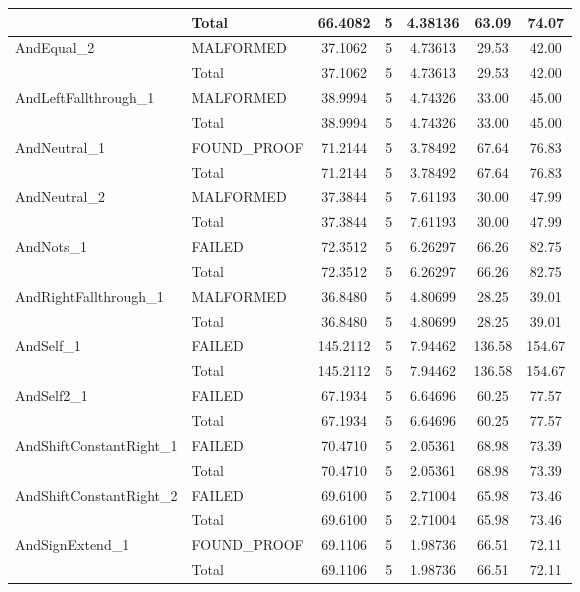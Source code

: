 \begin{appendices}
\begin{longtable}{L{0.25\textwidth} L{0.2\textwidth}  c  c  c  c  c }
    & Total & 66.4082 & 5 & 4.38136 & 63.09 & 74.07 \\ \midrule 
    AndEqual\_2 & MALFORMED & 37.1062 & 5 & 4.73613 & 29.53 & 42.00 \\ \midrule 
    & Total & 37.1062 & 5 & 4.73613 & 29.53 & 42.00 \\ \midrule 
    AndLeftFallthrough\_1 & MALFORMED & 38.9994 & 5 & 4.74326 & 33.00 & 45.00 \\ \midrule 
    & Total & 38.9994 & 5 & 4.74326 & 33.00 & 45.00 \\ \midrule 
    AndNeutral\_1 & FOUND\_PROOF & 71.2144 & 5 & 3.78492 & 67.64 & 76.83 \\ \midrule 
    & Total & 71.2144 & 5 & 3.78492 & 67.64 & 76.83 \\ \midrule 
    AndNeutral\_2 & MALFORMED & 37.3844 & 5 & 7.61193 & 30.00 & 47.99 \\ \midrule 
    & Total & 37.3844 & 5 & 7.61193 & 30.00 & 47.99 \\ \midrule 
    AndNots\_1 & FAILED & 72.3512 & 5 & 6.26297 & 66.26 & 82.75 \\ \midrule 
    & Total & 72.3512 & 5 & 6.26297 & 66.26 & 82.75 \\ \midrule 
    AndRightFallthrough\_1 & MALFORMED & 36.8480 & 5 & 4.80699 & 28.25 & 39.01 \\ \midrule 
    & Total & 36.8480 & 5 & 4.80699 & 28.25 & 39.01 \\ \midrule 
    AndSelf\_1 & FAILED & 145.2112 & 5 & 7.94462 & 136.58 & 154.67 \\ \midrule 
    & Total & 145.2112 & 5 & 7.94462 & 136.58 & 154.67 \\ \midrule 
    AndSelf2\_1 & FAILED & 67.1934 & 5 & 6.64696 & 60.25 & 77.57 \\ \midrule 
    & Total & 67.1934 & 5 & 6.64696 & 60.25 & 77.57 \\ \midrule 
    AndShiftConstantRight\_1 & FAILED & 70.4710 & 5 & 2.05361 & 68.98 & 73.39 \\ \midrule 
    & Total & 70.4710 & 5 & 2.05361 & 68.98 & 73.39 \\ \midrule 
    AndShiftConstantRight\_2 & FAILED & 69.6100 & 5 & 2.71004 & 65.98 & 73.46 \\ \midrule 
    & Total & 69.6100 & 5 & 2.71004 & 65.98 & 73.46 \\ \midrule 
    AndSignExtend\_1 & FOUND\_PROOF & 69.1106 & 5 & 1.98736 & 66.51 & 72.11 \\ \midrule 
    & Total & 69.1106 & 5 & 1.98736 & 66.51 & 72.11 \\ \midrule 

\end{longtable}
\end{appendices}
